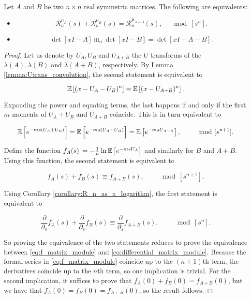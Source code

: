 \begin{theorem}
    Let $A$ and $B$ be two $n\times n$ real symmetric matrices. The following are equivalents:

    \begin{itemize}
        \item \[ \mathcal R_n^{\mu_A}(s) + \mathcal R_n^{\mu_B}(s) = \mathcal R_n^{\mu_{A+B}}(s), \quad \mod[s^n]. \]
        \item \[ \det[xI - A] \boxplus_n \det[xI-B] = \det[xI - A - B]. \]
    \end{itemize}
\end{theorem}

\begin{proof}
    Let us denote by $U_A, U_B$ and $U_{A+B}$ the $U$ transforms of the $\lambda(A), \lambda(B)$ and $\lambda(A+B)$, respectively. By Lemma \ref{lemma:Utrans_convolution}, the second statement is equivalent to 

    \begin{equation*}
        \mathbb E \left[  (x - U_A - U_B)^n  \right] = \mathbb E \left[  (x - U_{A+B})^n  \right].
    \end{equation*}

    Expanding the power and equating terms, the last happens if and only if the first $m$ moments of $U_A + U_B$ and $U_{A+B}$ coincide. This is in turn equivalent to 

    \begin{equation*}
        \mathbb E \left[ e^{-ms(U_A + U_B)} \right] = \mathbb E \left[ e^{-ms(U_A + U_B)} \right] = \mathbb E \left[  e^{-msU_{A+B}}  \right], \qquad \mod [s^{n+1}].
    \end{equation*}

    Define the function $f_A(s) \coloneqq - \frac1n \ln \mathbb E \left[  e^{-msU_A}  \right]$ and similarly for $B$ and $A+B$. Using this function, the second statement is equivalent to 

    \begin{equation} \label{eq:f_matrix_module}
        f_A(s) + f_B(s) \equiv f_{A+B}(s), \qquad \mod [s^{n+1}].
    \end{equation}

    Using Corollary \ref{corollary:R_n_as_a_logarithm}, the first statement is equivalent to 

    \begin{equation} \label{eq:differential_matrix_module}
        \frac{\partial}{\partial_s} f_A(s) + \frac{\partial}{\partial_s} f_B(s) \equiv \frac{\partial}{\partial_s} f_{A+B}(s), \qquad \mod[s^n].
    \end{equation}

    So proving the equivalence of the two statements reduces to prove the equivalence between \eqref{eq:f_matrix_module} and \eqref{eq:differential_matrix_module}. Because the formal series in \eqref{eq:f_matrix_module} coincide up to the $(n+1)$th term, the derivatives coincide up to the $n$th term, so one implication is trivial. For the second implication, it suffices to prove that $f_A(0) + f_B(0) = f_{A+B}(0)$, but we have that $f_A(0)=f_B(0)=f_{A+B}(0)$, so the result follows.
\end{proof} 

